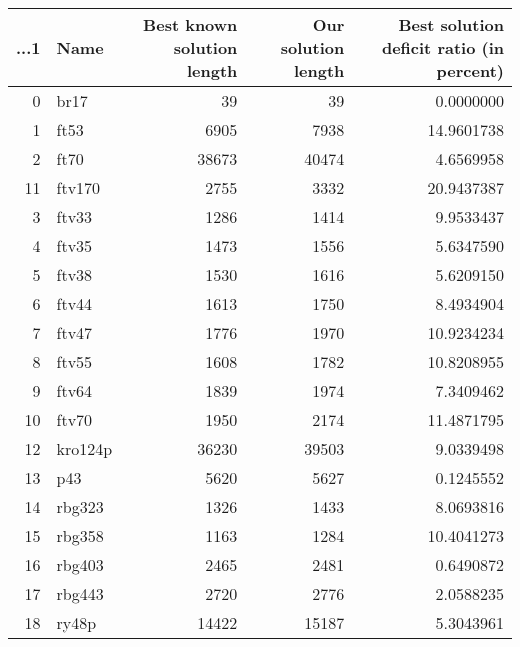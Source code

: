 \begin{table}
\centering
\begin{tabular}{r|l|r|r|r}
\hline
...1 & Name & Best known solution length & Our solution length & Best solution deficit ratio (in percent)\\
\hline
0 & br17 & 39 & 39 & 0.0000000\\
\hline
1 & ft53 & 6905 & 7938 & 14.9601738\\
\hline
2 & ft70 & 38673 & 40474 & 4.6569958\\
\hline
11 & ftv170 & 2755 & 3332 & 20.9437387\\
\hline
3 & ftv33 & 1286 & 1414 & 9.9533437\\
\hline
4 & ftv35 & 1473 & 1556 & 5.6347590\\
\hline
5 & ftv38 & 1530 & 1616 & 5.6209150\\
\hline
6 & ftv44 & 1613 & 1750 & 8.4934904\\
\hline
7 & ftv47 & 1776 & 1970 & 10.9234234\\
\hline
8 & ftv55 & 1608 & 1782 & 10.8208955\\
\hline
9 & ftv64 & 1839 & 1974 & 7.3409462\\
\hline
10 & ftv70 & 1950 & 2174 & 11.4871795\\
\hline
12 & kro124p & 36230 & 39503 & 9.0339498\\
\hline
13 & p43 & 5620 & 5627 & 0.1245552\\
\hline
14 & rbg323 & 1326 & 1433 & 8.0693816\\
\hline
15 & rbg358 & 1163 & 1284 & 10.4041273\\
\hline
16 & rbg403 & 2465 & 2481 & 0.6490872\\
\hline
17 & rbg443 & 2720 & 2776 & 2.0588235\\
\hline
18 & ry48p & 14422 & 15187 & 5.3043961\\
\hline
\end{tabular}
\end{table}
